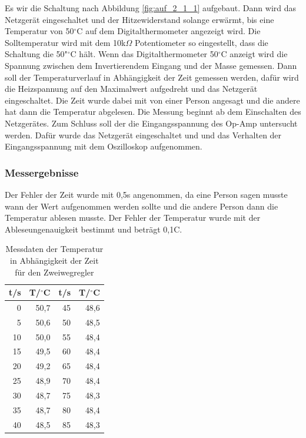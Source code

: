 \documentclass[12pt,a4paper]{article}
\begin{document}
Es wir die Schaltung nach Abbildung \ref{fig:auf_2_1_1} aufgebaut. Dann wird das Netzgerät eingeschaltet und der Hitzewiderstand solange erwärmt, bis eine Temperatur von 50$^\circ$C auf dem Digitalthermometer angezeigt wird. Die Solltemperatur wird mit dem 10k$\Omega$ Potentiometer so eingestellt, dass die Schaltung die 50"$^\circ$C hält. Wenn das Digitalthermometer 50$^\circ$C anzeigt wird die Spannung zwischen dem Invertierendem Eingang und der Masse gemessen. Dann soll der Temperaturverlauf in Abhängigkeit der Zeit gemessen werden, dafür wird die Heizspannung auf den Maximalwert aufgedreht und das Netzgerät eingeschaltet. Die Zeit wurde dabei mit von einer Person angesagt und die andere hat dann die Temperatur abgelesen. Die Messung beginnt ab dem Einschalten des Netzgerätes. Zum Schluss soll der die Eingangsspannung des Op-Amp untersucht werden. Dafür wurde das Netzgerät eingeschaltet und und das Verhalten der Eingangsspannung mit dem Oszilloskop aufgenommen.

\subsubsection*{Messergebnisse}

Der Fehler der Zeit wurde mit 0,5s angenommen, da eine Person sagen musste wann der Wert aufgenommen werden sollte und die andere Person dann die Temperatur ablesen musste. Der Fehler der Temperatur wurde mit der Ableseungenauigkeit bestimmt und beträgt 0,1C.

\begin{table}[htbp]
\centering
\begin{tabular}{||r|r||r|r||}

t/s & T/$^\circ$C & t/s & T/$^\circ$C \\ \hline
0 & 50,7 & 45 & 48,6 \\ 
5 & 50,6 & 50 & 48,5 \\ 
10 & 50,0 & 55 & 48,4 \\ 
15 & 49,5 & 60 & 48,4 \\ 
20 & 49,2 & 65 & 48,4 \\ 
25 & 48,9 & 70 & 48,4 \\ 
30 & 48,7 & 75 & 48,3 \\ 
35 & 48,7 & 80 & 48,4 \\ 
40 & 48,5 & 85 & 48,3 \\ 
\end{tabular}
\caption{Messdaten der Temperatur in Abhängigkeit der Zeit für den Zweiwegregler}
\label{tab:2_1}
\end{table}
\end{document}
